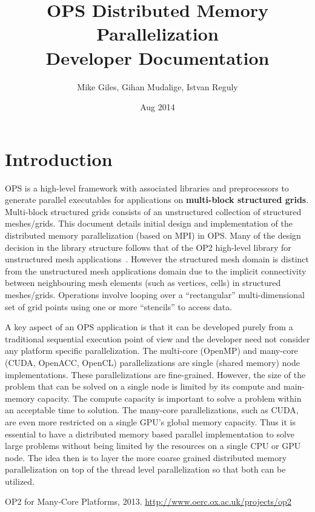 \documentclass[11pt]{article}
\date{Aug 2014}
\begin{document}
\title{OPS Distributed Memory Parallelization \\Developer Documentation}
\author{Mike Giles, Gihan Mudalige, Istvan Reguly}
\maketitle

\newpage


\tableofcontents


\newpage
\section{Introduction}


OPS is a high-level framework with associated libraries and preprocessors to generate parallel executables for
applications on \textbf{multi-block structured grids}. Multi-block structured grids consists of an unstructured
collection of structured meshes/grids. This document details initial design and implementation of the distributed
memory parallelization (based on MPI) in OPS. Many of the design decision in the library structure follows that of the
OP2 high-level library for unstructured mesh applications~\cite{op2}. However the structured mesh domain is distinct
from the unstructured mesh applications domain due to the implicit connectivity between neighbouring mesh elements (such
as vertices, cells) in structured meshes/grids. Operations involve looping over a ``rectangular'' multi-dimensional set
of grid points using one or more ``stencils'' to access data.

A key aspect of an OPS application is that it can be developed purely from a traditional sequential execution point of
view and the developer need not consider any platform specific parallelization. The multi-core (OpenMP) and
many-core (CUDA, OpenACC, OpenCL) parallelizations are single (shared memory) node implementations. These
parallelizations are fine-grained. However, the size of the problem that can be solved on a single node is limited by
its compute and main-memory capacity. The compute capacity is important to solve a problem within an acceptable time to
solution. The many-core parallelizations, such as CUDA, are even more restricted on a single GPU's global memory
capacity. Thus it is essential to have a distributed memory based parallel implementation to solve large problems
without being limited by the resources on a single CPU or GPU node. The idea then is to layer the more coarse grained
distributed memory parallelization on top of the thread level parallelization so that both can be utilized.

\begin{thebibliography}{1}
 OP2 for Many-Core Platforms, 2013. \url{http://www.oerc.ox.ac.uk/projects/op2}
\end{thebibliography}
\end{document}
